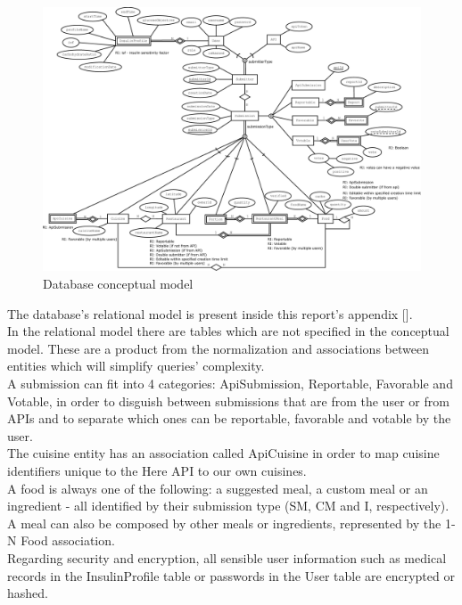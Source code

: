 \begin{figure}[H]    
    \includegraphics[scale=0.2]{_figures/Nutr.io_Database_Diagram.eps}
    \caption{Database conceptual model}
\end{figure}

The database's relational model is present inside this report's appendix [].\\

In the relational model there are tables which are not specified in the conceptual model.
These are a product from the normalization and associations between entities which will simplify queries' complexity.\\

A submission can fit into 4 categories: ApiSubmission, Reportable, Favorable and Votable, in order to disguish between submissions that
are from the user or from APIs and to separate which ones can be reportable, favorable and votable by the user.\\

The cuisine entity has an association called ApiCuisine in order to map cuisine identifiers unique to the Here API to our own cuisines.\\

A food is always one of the following: a suggested meal, a custom meal or an ingredient - all identified by their submission type (SM, CM and I, respectively).\\

A meal can also be composed by other meals or ingredients, represented by the 1-N Food association.\\

Regarding security and encryption, all sensible user information such as medical records in the InsulinProfile table 
or passwords in the User table are encrypted or hashed.\\

